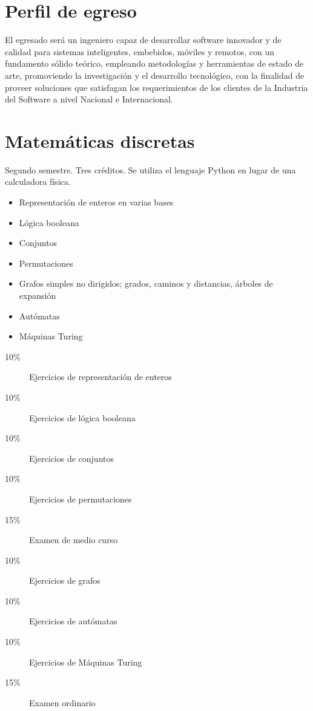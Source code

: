 \documentclass{article}
\begin{document}
\begin{multicols}{4}

\section*{Perfil de egreso}

El egresado ser\'{a} un ingeniero capaz de desarrollar software innovador
y de calidad para sistemas inteligentes, embebidos, m\'{o}viles y remotos,
con un fundamento s\'{o}lido te\'{o}rico, empleando metodolog\'{i}as y
herramientas de estado de arte, promoviendo la investigaci\'{o}n y el
desarrollo tecnol\'{o}gico, con la finalidad de proveer soluciones que
satisfagan los requerimientos de los clientes de la Industria del
Software a nivel Nacional e Internacional.

\vfill\null \columnbreak

\hypertarget{md}{\section*{Matem\'{a}ticas discretas}}

Segundo semestre. Tres cr\'{e}ditos. Se utiliza el lenguaje Python en
lugar de una calculadora f\'{i}sica. 

\begin{itemize}
\item{Representaci\'{o}n de enteros en varias bases}
\item{L\'{o}gica booleana}
\item{Conjuntos}
\item{Permutaciones}  
\item{Grafos simples no dirigidos; grados, caminos y distancias, \'{a}rboles de expansi\'{o}n}
\item{Aut\'{o}matas}
\item{M\'{a}quinas Turing}
\end{itemize}

\begin{description}
\item[10\%]{Ejercicios de representaci\'{o}n de enteros}
\item[10\%]{Ejercicios de l\'{o}gica booleana}
\item[10\%]{Ejercicios de conjuntos}
\item[10\%]{Ejercicios de permutaciones}
\item[15\%]{Examen de medio curso}
\item[10\%]{Ejercicios de grafos}
\item[10\%]{Ejercicios de aut\'{o}matas}
\item[10\%]{Ejercicios de M\'{a}quinas Turing}        
\item[15\%]{Examen ordinario}
\end{description}


\end{multicols}
\end{document}
